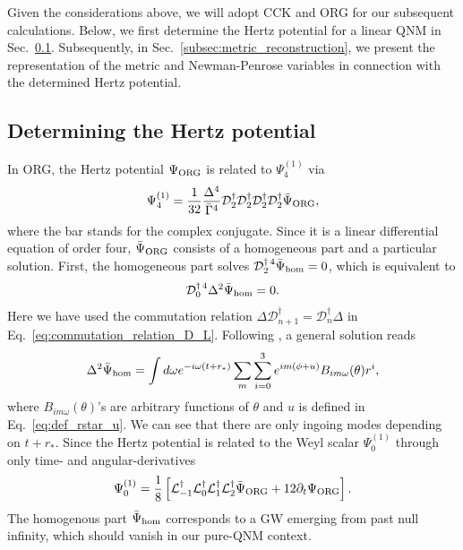 \documentclass[aps,prd,amsmath,floats,floatfix, twocolumn,
superscriptaddress,nofootinbib,showpacs]{revtex4-1}
\newcommand{\hertz}{\Psi_{\rm ORG}}
\newcommand{\hertzbar}{\bar{\Psi}_{\rm ORG}}
\begin{document}
Given the considerations above, we will adopt CCK and ORG for our subsequent calculations. Below, we first determine the Hertz potential for a linear QNM in Sec.~\ref{subsec:determining_hertz_potential}. Subsequently, in Sec.~\ref{subsec:metric_reconstruction}, we present the representation of the metric and Newman-Penrose variables in connection with the determined Hertz potential.

\subsection{Determining the Hertz potential}
\label{subsec:determining_hertz_potential}
In ORG, the Hertz potential $\hertz$ is related to  $\Psi_4^{(1)}$  via \cite{Whiting:2005hr,Keidl:2006wk,Keidl:2010pm} 
\begin{align}
    \Psi_4^{(1)}=\frac{1}{32}\frac{\Delta^4}{\bar{\Gamma}^4}\mathcal{D}_{2}^\dagger\mathcal{D}_{2}^\dagger\mathcal{D}_{2}^\dagger\mathcal{D}_2^\dagger\bar{\Psi}_{\rm ORG}, \label{eq:psi4_hertz}
\end{align}
where the bar stands for the complex conjugate. Since it is a linear differential equation of order four, $\bar{\Psi}_{\rm ORG}$ consists of a homogeneous part and a particular solution. First, the homogeneous part solves $\mathcal{D}_{2}^{\dagger\,4}\bar{\Psi}_{\rm hom}=0$, which is equivalent to 
\begin{align}
    \mathcal{D}_{0}^{\dagger\,4}\Delta^2\bar{\Psi}_{\rm hom}=0.
\end{align}
Here we have used the commutation relation $\Delta \mathcal{D}_{n+1}^\dagger=\mathcal{D}_n^\dagger \Delta$ in Eq.~\eqref{eq:commutation_relation_D_L}. 
Following \cite{Ori:2002uv}, a general solution reads 
\begin{align}
    \Delta^2\bar{\Psi}_{\rm hom}= \int d\omega e^{-i\omega (t+r_*)} \sum_m\sum_{i=0}^3 e^{im(\phi+u)} B_{im \omega}(\theta) r^i,
\end{align}
where $B_{im \omega}(\theta)$'s are arbitrary functions of $\theta$ and $u$ is defined in Eq.~\eqref{eq:def_rstar_u}. We can see that there are only ingoing modes depending on $t+r_*$. Since the Hertz potential is related to the Weyl scalar $\Psi_0^{(1)}$ through only time- and angular-derivatives  \cite{Whiting:2005hr,Keidl:2010pm}
\begin{align}
    \Psi_0^{(1)}=\frac{1}{8}\left[\mathcal{L}_{-1}^\dagger\mathcal{L}_{0}^\dagger\mathcal{L}_{1}^\dagger\mathcal{L}_{2}^\dagger \hertzbar+12\partial_t\hertz\right].
\end{align}
The homogenous part $\bar{\Psi}_{\rm hom}$ corresponds to a GW emerging from past null infinity, which should vanish in our pure-QNM context.
\end{document}

